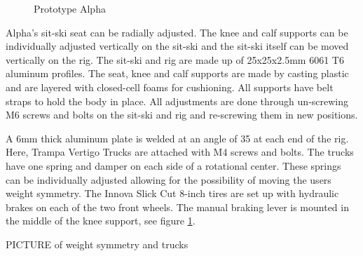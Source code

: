 \vspace{0.5cm}
\begin{figure}[htb!]
    \centering
    {\setlength{\fboxsep}{0pt}\setlength{\fboxrule}{1pt}
    }
    \captionsetup{justification=centering}
    \caption{Prototype Alpha}
    \label{alpha}
\end{figure}
\vspace{0.5cm}

Alpha's sit-ski seat can be radially adjusted. The knee and calf supports can be individually adjusted vertically on the sit-ski and the sit-ski itself can be moved vertically on the rig. The sit-ski and rig are made up of 25x25x2.5mm 6061 T6 aluminum profiles. The seat, knee and calf supports are made by casting plastic and are layered with closed-cell foams for cushioning. All supports have belt straps to hold the body in place. All adjustments are done through un-screwing M6 screws and bolts on the sit-ski and rig and re-screwing them in new positions.
\par
A 6mm thick aluminum plate is welded at an angle of 35{\degree} at each end of the rig. Here, Trampa Vertigo Trucks are attached with M4 screws and bolts. The trucks have one spring and damper on each side of a rotational center. These springs can be individually adjusted allowing for the possibility of moving the users weight symmetry. The Innova Slick Cut 8-inch tires are set up with hydraulic brakes on each of the two front wheels. The manual braking lever is mounted in the middle of the knee support, see figure \ref{alpha}.

PICTURE of weight symmetry and trucks

